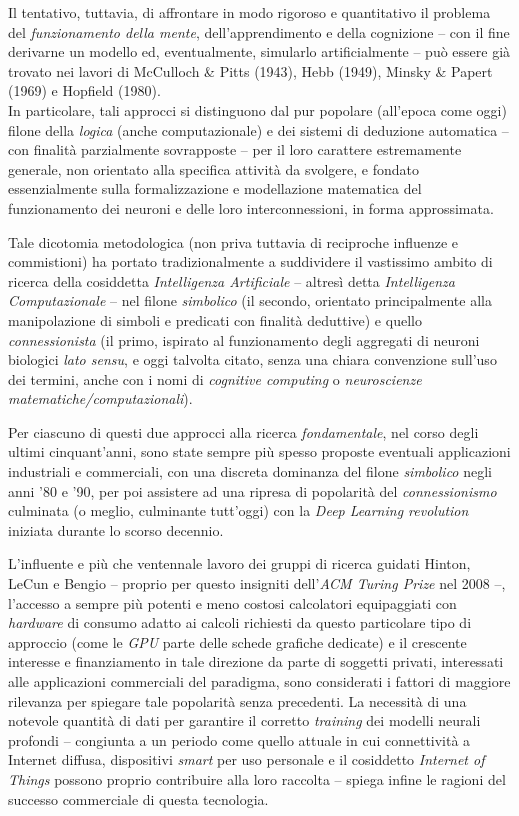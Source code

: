 \documentclass[a4paper, twoside]{article}
\begin{document}
Il tentativo, tuttavia, di affrontare in modo rigoroso e quantitativo il problema del \textit{funzionamento della mente}, dell'apprendimento e della cognizione -- con il fine derivarne un modello ed, eventualmente, simularlo artificialmente -- può essere già trovato nei lavori di McCulloch \& Pitts (1943), Hebb (1949), Minsky \& Papert (1969) e Hopfield (1980).\\
In particolare, tali approcci si distinguono dal pur popolare (all'epoca come oggi) filone della \textit{logica} (anche computazionale) e dei sistemi di deduzione automatica -- con finalità parzialmente sovrapposte -- per il loro carattere estremamente generale, non orientato alla specifica attività da svolgere, e fondato essenzialmente sulla formalizzazione e modellazione matematica del funzionamento dei neuroni e delle loro interconnessioni, in forma approssimata.

Tale dicotomia metodologica (non priva tuttavia di reciproche influenze e commistioni) ha portato tradizionalmente a suddividere il vastissimo ambito di ricerca della cosiddetta \textit{Intelligenza Artificiale} -- altresì detta \textit{Intelligenza Computazionale} -- nel filone \textit{simbolico} (il secondo, orientato principalmente alla manipolazione di simboli e predicati con finalità deduttive) e quello \textit{connessionista} (il primo, ispirato al funzionamento degli aggregati di neuroni biologici \textit{lato sensu}, e oggi talvolta citato, senza una chiara convenzione sull'uso dei termini, anche con i nomi di \textit{cognitive computing} o \textit{neuroscienze matematiche/computazionali}).

Per ciascuno di questi due approcci alla ricerca \textit{fondamentale}, nel corso degli ultimi cinquant'anni, sono state sempre più spesso proposte eventuali applicazioni industriali e commerciali, con una discreta dominanza del filone \textit{simbolico} negli anni '80 e '90, per poi assistere ad una ripresa di popolarità del \textit{connessionismo} culminata (o meglio, culminante tutt'oggi) con la \textit{Deep Learning revolution} iniziata durante lo scorso decennio.

L'influente e più che ventennale lavoro dei gruppi di ricerca guidati Hinton, LeCun e Bengio -- proprio per questo insigniti dell'\textit{ACM Turing Prize} nel 2008 --, l'accesso a sempre più potenti e meno costosi calcolatori equipaggiati con \textit{hardware} di consumo adatto ai calcoli richiesti da questo particolare tipo di approccio (come le \textit{GPU} parte delle schede grafiche dedicate) e il crescente interesse e finanziamento in tale direzione da parte di soggetti privati, interessati alle applicazioni commerciali del paradigma, sono considerati i fattori di maggiore rilevanza per spiegare tale popolarità senza precedenti. La necessità di una notevole quantità di dati per garantire il corretto \textit{training} dei modelli neurali profondi -- congiunta a un periodo come quello attuale in cui connettività a Internet diffusa, dispositivi \textit{smart} per uso personale e il cosiddetto \textit{Internet of Things} possono proprio contribuire alla loro raccolta -- spiega infine le ragioni del successo commerciale di questa tecnologia.
\end{document}
